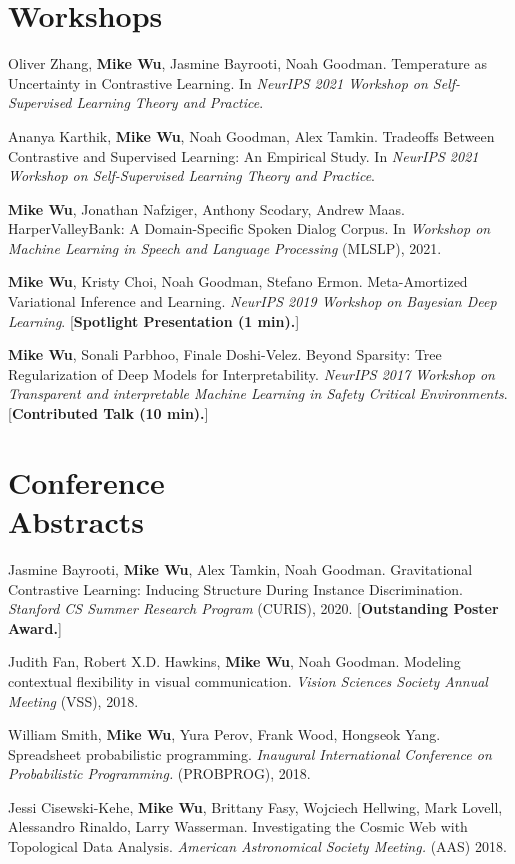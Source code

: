 \documentclass[margin, 10pt]{res} %
\begin{document}
\begin{resume}
\section{Workshops}

Oliver Zhang, \textbf{Mike Wu}, Jasmine Bayrooti, Noah Goodman. Temperature as Uncertainty in Contrastive Learning. In \textit{NeurIPS 2021 Workshop on Self-Supervised Learning Theory and Practice}.

Ananya Karthik, \textbf{Mike Wu}, Noah Goodman, Alex Tamkin. Tradeoffs Between Contrastive and Supervised Learning: An Empirical Study. In \textit{NeurIPS 2021 Workshop on Self-Supervised Learning Theory and Practice}.

\textbf{Mike Wu}, Jonathan Nafziger, Anthony Scodary, Andrew Maas. HarperValleyBank: A Domain-Specific Spoken Dialog Corpus. In \textit{Workshop on Machine Learning in Speech and Language Processing} (MLSLP), 2021.

\textbf{Mike Wu}, Kristy Choi, Noah Goodman, Stefano Ermon. Meta-Amortized Variational Inference and Learning. \textit{NeurIPS 2019 Workshop on Bayesian Deep Learning}. [\textbf{Spotlight Presentation (1 min).}]

\textbf{Mike Wu}, Sonali Parbhoo, Finale Doshi-Velez. Beyond Sparsity: Tree Regularization of Deep Models for Interpretability. \textit{NeurIPS 2017 Workshop on Transparent and interpretable Machine Learning in Safety Critical Environments}. [\textbf{Contributed Talk (10 min).}]

\section{Conference \\ Abstracts}

Jasmine Bayrooti, \textbf{Mike Wu}, Alex Tamkin, Noah Goodman. Gravitational Contrastive Learning: Inducing Structure During Instance Discrimination. \textit{Stanford CS Summer Research Program} (CURIS), 2020. [\textbf{Outstanding Poster Award.}]

Judith Fan, Robert X.D. Hawkins, \textbf{Mike Wu}, Noah Goodman. Modeling contextual flexibility in visual communication. \textit{Vision Sciences Society Annual Meeting} (VSS), 2018.

William Smith, \textbf{Mike Wu}, Yura Perov, Frank Wood, Hongseok Yang. Spreadsheet probabilistic programming. \textit{Inaugural International Conference on Probabilistic Programming.} (PROBPROG), 2018.

Jessi Cisewski-Kehe, \textbf{Mike Wu}, Brittany Fasy, Wojciech Hellwing, Mark Lovell, Alessandro Rinaldo, Larry Wasserman. Investigating the Cosmic Web with Topological Data Analysis. \textit{American Astronomical Society Meeting.} (AAS) 2018.


\end{resume}
\end{document}
